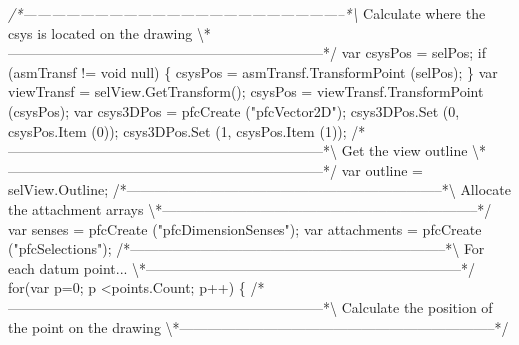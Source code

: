 \documentclass[]{article}
\newenvironment{Shaded}{}{}
\newcommand{\FloatTok}[1]{\textcolor[rgb]{0.25,0.63,0.44}{{#1}}}
\newcommand{\CommentTok}[1]{\textcolor[rgb]{0.38,0.63,0.69}{\textit{{#1}}}}
\newcommand{\OtherTok}[1]{\textcolor[rgb]{0.00,0.44,0.13}{{#1}}}
\newcommand{\NormalTok}[1]{{#1}}
\begin{document}
\begin{Shaded}
\begin{Highlighting}[]
\CommentTok{/*--------------------------------------------------------------------*\textbackslash{}}
  \NormalTok{Calculate where the csys is located on the drawing}
\NormalTok{\textbackslash{}*--------------------------------------------------------------------*}\OtherTok{/ }
\OtherTok{  }
\OtherTok{  var csysPos = selPos;}
\OtherTok{  if }\FloatTok{(}\OtherTok{asmTransf != void null}\FloatTok{)}
\OtherTok{    \{}
\OtherTok{      csysPos = asmTransf.TransformPoint }\FloatTok{(}\OtherTok{selPos}\FloatTok{)}\OtherTok{;}
\OtherTok{    \}}
\OtherTok{  var viewTransf = selView.GetTransform}\FloatTok{()}\OtherTok{;}
\OtherTok{  csysPos = viewTransf.TransformPoint }\FloatTok{(}\OtherTok{csysPos}\FloatTok{)}\OtherTok{;}
\OtherTok{  }
\OtherTok{  var csys3DPos = pfcCreate }\FloatTok{(}\OtherTok{"pfcVector2D"}\FloatTok{)}\OtherTok{;}
\OtherTok{  }
\OtherTok{  csys3DPos.Set }\FloatTok{(}\OtherTok{0, csysPos.Item }\FloatTok{(}\OtherTok{0}\FloatTok{))}\OtherTok{;}
\OtherTok{  csys3DPos.Set }\FloatTok{(}\OtherTok{1, csysPos.Item }\FloatTok{(}\OtherTok{1}\FloatTok{))}\OtherTok{;  }
\OtherTok{  }
\OtherTok{/}\NormalTok{*--------------------------------------------------------------------*\textbackslash{}    }
  \NormalTok{Get the view outline}
\NormalTok{\textbackslash{}*--------------------------------------------------------------------*}\OtherTok{/    }
\OtherTok{  var outline = selView.Outline;}
\OtherTok{  }
\OtherTok{/}\NormalTok{*--------------------------------------------------------------------*\textbackslash{}    }
  \NormalTok{Allocate the attachment arrays}
\NormalTok{\textbackslash{}*--------------------------------------------------------------------*}\OtherTok{/    }
\OtherTok{  var senses = pfcCreate }\FloatTok{(}\OtherTok{"pfcDimensionSenses"}\FloatTok{)}\OtherTok{;}
\OtherTok{  var attachments = pfcCreate }\FloatTok{(}\OtherTok{"pfcSelections"}\FloatTok{)}\OtherTok{;}
\OtherTok{    }
\OtherTok{/}\NormalTok{*--------------------------------------------------------------------*\textbackslash{}    }
  \NormalTok{For each datum }\OtherTok{point}\NormalTok{...}
\NormalTok{\textbackslash{}*--------------------------------------------------------------------*}\OtherTok{/    }
\OtherTok{  for}\FloatTok{(}\OtherTok{var p=0; p <points.Count; p}\FloatTok{++)}
\OtherTok{    \{}
\OtherTok{      }
\OtherTok{/}\NormalTok{*--------------------------------------------------------------------*\textbackslash{}  }
  \NormalTok{Calculate the position of the point on the drawing}
\NormalTok{\textbackslash{}*--------------------------------------------------------------------*}\OtherTok{/ }

\end{Highlighting}
\end{Shaded}
\end{document}
